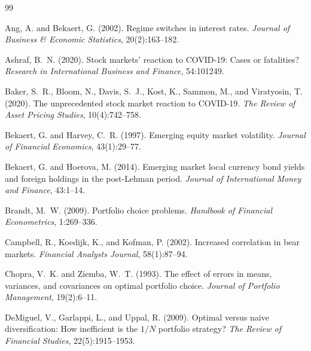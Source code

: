 \documentclass[12pt,a4paper]{article}
\begin{document}

\begin{thebibliography}{99}

Ang, A. and Bekaert, G. (2002).
\newblock Regime switches in interest rates.
\newblock \textit{Journal of Business \& Economic Statistics}, 20(2):163--182.

Ashraf, B.~N. (2020).
\newblock Stock markets' reaction to {COVID-19}: Cases or fatalities?
\newblock \textit{Research in International Business and Finance}, 54:101249.

Baker, S.~R., Bloom, N., Davis, S.~J., Kost, K., Sammon, M., and Viratyosin, T. (2020).
\newblock The unprecedented stock market reaction to {COVID-19}.
\newblock \textit{The Review of Asset Pricing Studies}, 10(4):742--758.

Bekaert, G. and Harvey, C.~R. (1997).
\newblock Emerging equity market volatility.
\newblock \textit{Journal of Financial Economics}, 43(1):29--77.

Bekaert, G. and Hoerova, M. (2014).
\newblock Emerging market local currency bond yields and foreign holdings in the post-{Lehman} period.
\newblock \textit{Journal of International Money and Finance}, 43:1--14.

Brandt, M.~W. (2009).
\newblock Portfolio choice problems.
\newblock \textit{Handbook of Financial Econometrics}, 1:269--336.

Campbell, R., Koedijk, K., and Kofman, P. (2002).
\newblock Increased correlation in bear markets.
\newblock \textit{Financial Analysts Journal}, 58(1):87--94.

Chopra, V.~K. and Ziemba, W.~T. (1993).
\newblock The effect of errors in means, variances, and covariances on optimal portfolio choice.
\newblock \textit{Journal of Portfolio Management}, 19(2):6--11.

DeMiguel, V., Garlappi, L., and Uppal, R. (2009).
\newblock Optimal versus naive diversification: How inefficient is the $1/N$ portfolio strategy?
\newblock \textit{The Review of Financial Studies}, 22(5):1915--1953.


\end{thebibliography}
\end{document}
